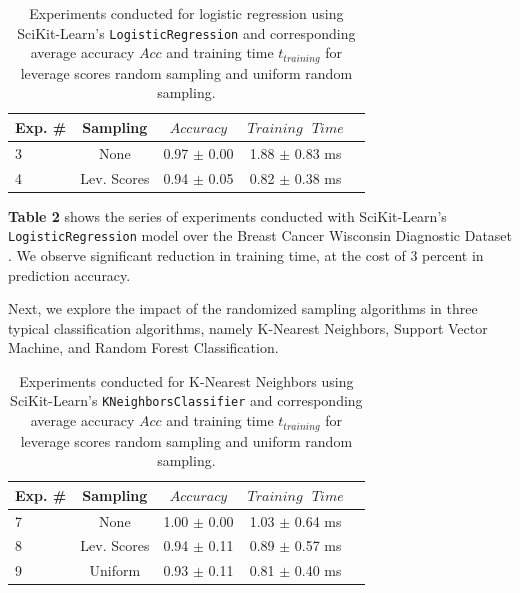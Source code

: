 \documentclass{article}
\theoremstyle{plain}
\theoremstyle{definition}
\theoremstyle{remark}
\begin{document}
\begin{table}[t]
	\caption{Experiments conducted for logistic regression using SciKit-Learn's \texttt{LogisticRegression} and corresponding average accuracy $Acc$ and training time $t_{training}$ for leverage scores random sampling and uniform random sampling.}
	\label{t2}
	\vskip 0.15in
	\begin{center}
		\begin{small}
			\begin{sc}
				\begin{tabular}{lcccr}
					\toprule
					Exp. \# & Sampling & $Accuracy$ & $Training \text{ } Time$\\
					\midrule
					3 & None & 0.97 $\pm$ 0.00 & 1.88 $\pm$ 0.83 ms \\
					4 & Lev. Scores & 0.94 $\pm$ 0.05 & 0.82 $\pm$ 0.38 ms \\
					\bottomrule
				\end{tabular}
			\end{sc}
		\end{small}
	\end{center}
	\vskip -0.1in
\end{table}

\textbf{Table 2} shows the series of experiments conducted with SciKit-Learn's \texttt{LogisticRegression} model over the Breast Cancer Wisconsin Diagnostic Dataset \cite{breastcancer}. We observe significant reduction in training time, at the cost of 3 percent in prediction accuracy.

Next, we explore the impact of the randomized sampling algorithms in three typical classification algorithms, namely K-Nearest Neighbors, Support Vector Machine, and Random Forest Classification.

\begin{table}[t]
	\caption{Experiments conducted for K-Nearest Neighbors using SciKit-Learn's \texttt{KNeighborsClassifier} and corresponding average accuracy $Acc$ and training time $t_{training}$ for leverage scores random sampling and uniform random sampling.}
	\label{t3}
	\vskip 0.15in
	\begin{center}
		\begin{small}
			\begin{sc}
				\begin{tabular}{lcccr}
					\toprule
					Exp. \# & Sampling & $Accuracy$ & $Training \text{ } Time$\\
					\midrule
					7 & None & 1.00 $\pm$ 0.00 & 1.03 $\pm$ 0.64 ms \\
					8 & Lev. Scores & 0.94 $\pm$ 0.11 & 0.89 $\pm$ 0.57 ms \\
					9 & Uniform & 0.93 $\pm$ 0.11 & 0.81 $\pm$ 0.40 ms \\
					\bottomrule
				\end{tabular}
			\end{sc}
		\end{small}
	\end{center}
	\vskip -0.1in
\end{table}
\end{document}
